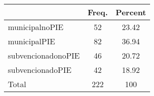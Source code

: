 {
\def\sym#1{\ifmmode^{#1}\else\(^{#1}\)\fi}
\begin{tabular}{l*{1}{cc}}
\hline\hline
          &    Freq.&  Percent\\
\hline
municipalnoPIE&       52&    23.42\\
municipalPIE&       82&    36.94\\
subvencionadonoPIE&       46&    20.72\\
subvencionadoPIE&       42&    18.92\\
Total     &      222&      100\\
\hline\hline
\end{tabular}
}
